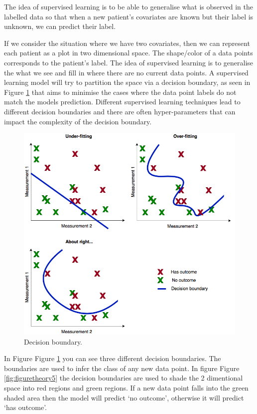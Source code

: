 \documentclass[11pt]{book}
\theoremstyle{definition}
\theoremstyle{definition}
\theoremstyle{definition}
\theoremstyle{remark}
\begin{document}
The idea of supervised learning is to be able to generalise what is observed in the labelled data so that when a new patient's covariates are known but their label is unknown, we can predict their label.

If we consider the situation where we have two covariates, then we can represent each patient as a plot in two dimensional space. The shape/color of a data points corresponds to the patient's label. The idea of supervised learning is to generalise the what we see and fill in where there are no current data points. A supervised learning model will try to partition the space via a decision boundary, as seen in Figure \ref{fig:figuretheory4} that aims to minimise the cases where the data point labels do not match the models prediction. Different supervised learning techniques lead to different decision boundaries and there are often hyper-parameters that can impact the complexity of the decision boundary.

\begin{figure}
\includegraphics[width=1\linewidth]{images/PatientLevelPrediction/theory/learning} \caption{Decision boundary.}\label{fig:figuretheory4}
\end{figure}

In Figure Figure \ref{fig:figuretheory4} you can see three different decision boundaries. The boundaries are used to infer the class of any new data point. In figure Figure \ref{fig:figuretheory5} the decision boundaries are used to shade the 2 dimentional space into red regions and green regions. If a new data point falls into the green shaded area then the model will predict `no outcome', otherwise it will predict `has outcome'.
\end{document}
